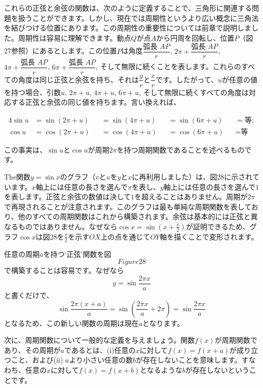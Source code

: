 \documentclass[a4paper,11pt,openany]{ltjsbook}
\begin{document}
これらの正弦と余弦の関数は、次のように定義することで、三角形に関連する問題を扱うことができます。しかし、現在では周期性というより広い概念に三角法を結びつける位置にあります。この周期性の重要性については前章で説明しました。周期性は容易に理解できます。動点$Q$が点$A$から円周を回転し、位置$P$（図27参照）にあるとします。この位置$P$は角度$\dfrac{\text{弧長 } AP}{r}$, $2\pi + \dfrac{\text{弧長 } AP}{r}$, $4\pi + \dfrac{\text{弧長 } AP}{r}$, $6\pi + \dfrac{\text{弧長 } AP}{r}$, そして無限に続くことを表します。これらのすべての角度は同じ正弦と余弦を持ち、それは$\dfrac{y}{r}$と$\dfrac{x}{r}$です。したがって、$u$が任意の値を持つ場合、引数$u$, $2\pi + u$, $4\pi + u$, $6\pi + u$, そして無限に続くすべての角度は対応する正弦と余弦の同じ値を持ちます。言い換えれば、

\begin{alignat*}{4}
\sin u &= \sin(2\pi + u) &&= \sin(4\pi + u) &&= \sin(6\pi + u) &&= \text{等}; \\
\cos u &= \cos(2\pi + u) &&= \cos(4\pi + u) &&= \cos(6\pi + u) &&= \text{等}
\end{alignat*}

この事実は、$\sin u$と$\cos u$が周期$2\pi$を持つ周期関数であることを述べるものです。

The関数$y = \sin x$のグラフ（$v$と$u$を$y$と$x$に再利用しました）は、図28に示されています。$x$軸上には任意の長さを選んで$\pi$を表し、$y$軸上には任意の長さを選んで$1$を表します。正弦と余弦の数値は決して$1$を超えることはありません。周期が$2\pi$で再現されることが注意されます。このグラフは最も単純な周期関数を表しており、他のすべての周期関数はこれから構築されます。余弦は基本的には正弦と異なるものではありません。なぜなら$\cos x = \sin(x + \frac{\pi}{2})$が証明できるため、グラフ$\cos x$は図28を$\frac{\pi}{2}$を示す$OX$上の点を通じて$OY$軸を描くことで変形されます。

任意の周期$a$を持つ`正弦'関数を図\[Figure{28}\]で構築することは容易です。なぜなら
\[
y = \sin \frac{2\pi x}{a}
\]
と書くだけで、
\[
\sin \frac{2\pi (x + a)}{a} = \sin \left(\frac{2\pi x}{a} + 2\pi\right) = \sin \frac{2\pi x}{a}
\]
となるため、この新しい関数の周期は現在$a$となります。

次に、周期関数について一般的な定義を与えましょう。関数$f(x)$が周期関数であり、その周期が$a$であるとは、(i)任意の$x$に対して$f(x) = f(x + a)$が成り立つこと、および(ii) $a$より小さい任意の数$b$が存在しないことを意味します。すなわち、任意の$x$に対して$f(x) = f(x + b)$となるような$b$が存在しないということです。
\end{document}
